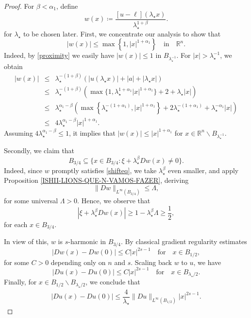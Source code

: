 \documentclass[reqno,11pt]{amsart}
\numberwithin{equation}{section}
\numberwithin{equation}{section}
\begin{document}
\begin{proof}
For $\beta < \alpha_1$, define
$$
    w(x) \coloneqq \frac{[u-\ell](\lambda_\star x)}{\lambda_\star^{1+\beta}}.
$$
for $\lambda_\star$ to be chosen later. First, we concentrate our analysis to show that 
$$
   |w(x)| \leq \max\left\{1,|x|^{1+\alpha_1}\right\} \quad \mbox{in} \quad \mathbb{R}^n. 
$$ 
Indeed, by \eqref{proximity} we easily have $|w(x)| \leq 1$ in $B_{\lambda_\star^{-1}}$. For $|x| > \lambda_\star^{-1}$, we obtain
\begin{eqnarray*}
    |w(x)| & \leq & \lambda_\star^{-(1+\beta)}\left(|u(\lambda_\star x)| + |a| + |\lambda_\star x|\right)\\
           & \leq & \lambda_\star^{-(1+\beta)}\left(\max\{1,\lambda_\star^{1+\alpha_1}|x|^{1+\alpha_1}\} + 2 + \lambda_\star|x|\right)\\
           & \leq & \lambda_\star^{\alpha_1 - \beta}\left(\max\left\{\lambda_\star^{-(1+\alpha_1)},|x|^{1+\alpha_1} \right\} + 2\lambda_\star^{-(1+\alpha_1)} + \lambda_\star^{-\alpha_1}|x|\right)\\
           & \leq & 4\lambda_\star^{\alpha_1 - \beta}|x|^{1+\alpha_1}.
\end{eqnarray*}
Assuming $4 \lambda_\star^{\alpha_1 - \beta} \leq 1$, it implies that $|w(x)| \leq |x|^{1+\alpha_1}$ for $x \in \mathbb{R}^n \backslash B_{ \lambda_\star^{-1}}$.

Secondly, we claim that
$$
   B_{3/4} \subseteq \{x \in B_{3/4} \colon \xi + \lambda_\star^\beta Dw(x) \not = 0 \}. 
$$
Indeed, since $w$ promptly satisfies \eqref{shifteq}, we take $\lambda_\star^\beta$ even smaller, and apply Proposition \ref{ISHII-LIONS-QUE-N-VAMOS-FAZER}, deriving 
$$
    \|Dw\|_{L^\infty(B_{3/4})} \leq \Lambda,
$$
for some universal $\Lambda>0$. Hence, we observe that
$$
    |\xi + \lambda_\star^\beta Dw(x)| \geq 1 - \lambda_\star^\beta \Lambda \geq \frac{1}{2},
$$
for each $x \in B_{3/4}$.

In view of this, $w$ is $s$-harmonic in $B_{3/4}$. By classical gradient regularity estimates
\begin{equation}\label{eq:estimate}
    |Dw(x) - Dw(0)| \leq C|x|^{2s-1} \quad \mbox{for} \quad x \in B_{1/2},
\end{equation}
for some $C>0$ depending only on $n$ and $s$. Scaling back $w$ to $u$, we have
$$
    |Du(x) - Du(0)| \leq C|x|^{2s-1} \quad \mbox{for} \quad x \in B_{\lambda_\star/2}.
$$
Finally, for $x \in B_{1/2} \backslash B_{\lambda_\star/2}$, we conclude that
\begin{eqnarray*}
    |Du(x) - Du(0)| \leq  \dfrac{4}{\lambda_\star}\|Du\|_{L^\infty(B_{1/2})}|x|^{2s-1}.
\end{eqnarray*}
\end{proof}
\end{document}
